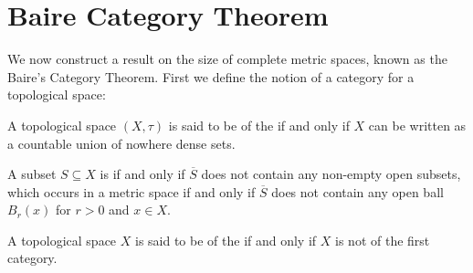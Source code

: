 \section{Baire Category Theorem}

We now construct a result on the size of complete metric spaces, known as the Baire's Category Theorem. First we define the notion of a category for a topological space:

\begin{defn}
    A topological space $(X,\tau)$ is said to be of the  if and only if $X$ can be written as a countable union of nowhere dense sets.
\end{defn}

\begin{defn}
    A subset $S \subseteq X$ is  if and only if $\overline{S}$ does not contain any non-empty open subsets, which occurs in a metric space if and only if $\overline{S}$ does not contain any open ball $B_r(x)$ for $r > 0$ and $x \in X$.
\end{defn}

\begin{defn}
    A topological space $X$ is said to be of the  if and only if $X$ is not of the first category.
\end{defn}

